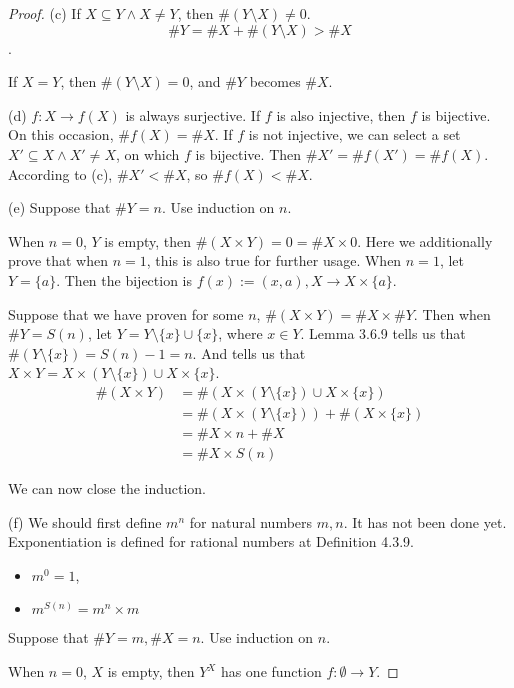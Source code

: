 \begin{proof}
(c)
If $X \subseteq Y \wedge X \neq Y$, then $\#(Y \setminus X) \neq 0$. 
\[
\#Y = \#X + \#(Y \setminus X) > \#X
\].

If $X = Y$, then $\#(Y \setminus X) = 0$, and $\#Y$ becomes $\#X$.

(d)
$f: X \rightarrow f(X)$ is always surjective. If $f$ is also injective, then $f$ is bijective. On this 
occasion, $\#f(X) = \#X$. If $f$ is not injective, we can select a set $X' \subseteq X \wedge X' \neq X$, 
on which $f$ is bijective. Then $\#X' = \#f(X') = \#f(X)$. According to (c), $\#X' < \#X$, so 
$\#f(X) < \#X$.

(e)
Suppose that $\#Y = n$. Use induction on $n$. 

When $n=0$, $Y$ is empty, then $\#(X \times Y) = 0 = \#X \times 0$. Here we additionally prove that 
when $n=1$, this is also true for further usage. When $n=1$, let $Y = \{a\}$. Then the bijection is 
$f(x):=(x,a), X \rightarrow X \times \{a\}$.

Suppose that we have proven for some $n$, $\#(X \times Y) = \#X \times \#Y$. Then when $\#Y = S(n)$, 
let $Y = Y\setminus\{x\}\cup\{x\}$, where $x \in Y$. Lemma 3.6.9 tells us that 
$\#(Y\setminus\{x\}) = S(n)-1 = n$. And  tells us that 
$X \times Y = X \times (Y\setminus\{x\}) \cup X \times \{x\}$. 
\begin{align*}
\#(X \times Y) 
&= \#(X \times (Y\setminus\{x\}) \cup X \times \{x\}) \\
&= \#(X \times (Y\setminus\{x\})) + \#(X \times \{x\}) \\
&= \#X \times n + \#X \\
&= \#X \times S(n)
\end{align*}

We can now close the induction.

(f)
We should first define $m^n$ for natural numbers $m,n$. It has not been done yet. Exponentiation is 
defined for rational numbers at Definition 4.3.9.
\begin{defn}
\begin{itemize}
\item $m^0=1$,
\item $m^{S(n)} = m^n \times m$
\end{itemize}
\end{defn}

Suppose that $\#Y = m,\#X = n$. Use induction on $n$. 

When $n=0$, $X$ is empty, then $Y^X$ has one function $f:\emptyset \rightarrow Y$.


\end{proof}
